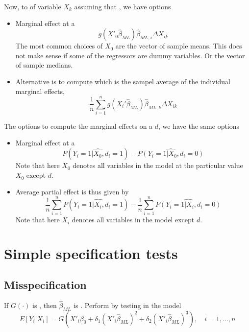Now, to  of variable $X_k$ assuming that , we have options 
\begin{itemize}
    \item Marginal effect at a 
    \begin{equation*}
        g(X'_0\hat{\beta}_{ML})\hat{\beta}_{ML,i}\Delta X_{ik}
    \end{equation*}
    The most common choices of $X_0$ are the vector of sample means. This does not make sense if some of the regressors are dummy variables.
    Or the vector of sample medians.
    \item Alternative is to compute  which is the sampel average of the individual marginal effects,
    \begin{equation*}
        \frac{1}{n}\sum_{i=1}^{n}g(X_i'\hat{\beta}_{ML})\hat{\beta}_{ML,k}\Delta X_{ik}
    \end{equation*}
\end{itemize}
The options to compute the marginal effects on a  $d$, we have the same options 
\begin{itemize}
    \item Marginal effect at a 
    \begin{equation*}
        P(\widehat{Y_i=1|X_0,d_i=1}) - \widehat{P(Y_i=1|X_0,d_i=0)}
    \end{equation*}
    Note that here $X_0$ denotes all variables in the model at the particular value $X_0$ except $d$.
    \item Average partial effect is thus given by 
    \begin{equation*}
        \frac{1}{n}\sum_{i=1}^{n}P(\widehat{Y_i=1|X_i,d_i=1}) - \frac{1}{n}\sum_{i=1}^{n}\widehat{P(Y_i=1|X_i,d_i=0)}
    \end{equation*}
    Note that here $X_i$ denotes all variables in the model except $d$.
\end{itemize}

\section{Simple specification tests}
\subsection{Misspecification}
If $G(\cdot)$ is , then $\hat{\beta}_{ML}$ is . 
Perform  by testing  in the model 
\begin{equation*}
    E[Y_i|X_i] = G(X'_i\beta_0+\delta_1(X'_i\hat{\beta}_{ML})^2+\delta_2(X'_i\hat{\beta}_{ML})^3),\quad i=1,\ldots,n
\end{equation*}
\\


